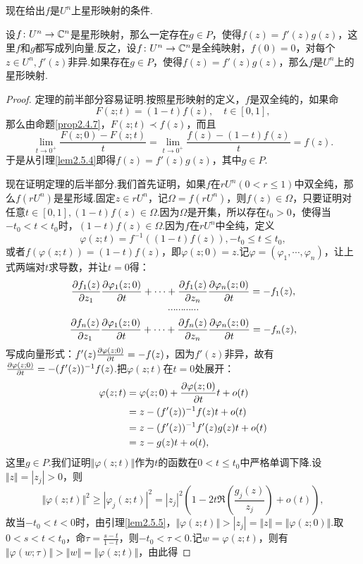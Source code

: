 现在给出$f$是$U^n$上星形映射的条件.
\begin{theorem}\label{thm2.5.6}
	设$f\colon U^n\to\mathbb C^n$是星形映射，那么一定存在$g\in P$，使得$f(z)=f'(z)g(z)$，这里$f$和$g$都写成列向量.反之，设$f\colon U^n\to\mathbb C^n$是全纯映射，$f(0)=0$，对每个$z\in U^n,f'(z)$非异.如果存在$g\in P$，使得$f(z)=f'(z)g(z)$，那么$f$是$U^n$上的星形映射.
\end{theorem}
\begin{proof}
	定理的前半部分容易证明.按照星形映射的定义，$f$是双全纯的，如果命
	\[F(z;t)=(1-t)f(z),\quad t\in[0,1],\]
	那么由命题\ref{prop2.4.7}，$F(z;t)\prec f(z)$，而且
	\[
	\lim_{t\to 0^+}\frac{F(z;0)-F(z;t)}{t}
	=\lim_{t\to 0^+}\frac{f(z)-(1-t)f(z)}{t}
	=f(z).
	\]
	于是从引理\ref{lem2.5.4}即得$f(z)=f'(z)g(z)$，其中$g\in P$.
	
	现在证明定理的后半部分.我们首先证明，如果$f$在$rU^n(0<r\le1)$中双全纯，那么$f(rU^n)$是星形域.固定$z\in rU^n$，记$\Omega=f(rU^n)$，则$f(z)\in\Omega$，只要证明对任意$t\in[0,1],(1-t)f(z)\in\Omega$.因为$\Omega$是开集，所以存在$t_0>0$，使得当$-t_0<t<t_0$时，$(1-t)f(z)\in\Omega$.因为$f$在$rU^n$中全纯，定义
	\[\varphi(z;t)=f^{-1}((1-t)f(z)),-t_0\le t\le t_0,\]
	或者$f(\varphi(z;t))=(1-t)f(z)$，即$\varphi(z;0)=z$.记$\varphi=(\varphi_1,\cdots,\varphi_n)$，让上式两端对$t$求导数，并让$t=0$得：
	\[\frac{\partial f_1(z)}{\partial z_1}\frac{\partial \varphi_1(z;0)}{\partial t}+\cdots+\frac{\partial f_1(z)}{\partial z_n}\frac{\partial \varphi_n(z;0)}{\partial t}=-f_1(z),\]
	\[\cdots\cdots\cdots\cdots\]
	\[\frac{\partial f_n(z)}{\partial z_1}\frac{\partial \varphi_1(z;0)}{\partial t}+\cdots+\frac{\partial f_n(z)}{\partial z_n}\frac{\partial \varphi_n(z;0)}{\partial t}=-f_n(z),\]
	写成向量形式：$f'(z)\frac{\partial \varphi(z;0)}{\partial t}=-f(z)$，因为$f'(z)$非异，故有$\frac{\partial \varphi(z;0)}{\partial t}=-(f'(z))^{-1}f(z)$.把$\varphi(z;t)$在$t=0$处展开：
	\begin{align*}
		\varphi(z;t)
		&=\varphi(z;0)+\frac{\partial \varphi(z;0)}{\partial t}t+o(t)\\
		&=z-(f'(z))^{-1} f(z)t+o(t)\\
		&=z-(f'(z))^{-1} f'(z)g(z)t+o(t)\\
		&=z-g(z)t+o(t),
	\end{align*}
这里$g\in P$.我们证明$\Vert\varphi(z;t)\Vert$作为$t$的函数在$0<t\le t_0$中严格单调下降.设$\Vert z\Vert=|z_j|>0$，则
\begin{equation}\label{eq2.5.5}
	\Vert\varphi(z;t)\Vert^2\ge|\varphi_j(z;t)|^2
	=|z_j|^2\left(1-2t\Re\left(\frac{g_j(z)}{z_j}\right)+o(t)\right),
\end{equation}
故当$-t_0<t<0$时，由引理\ref{lem2.5.5}，$\Vert\varphi(z;t)\Vert>|z_j|=\Vert z\Vert=\Vert\varphi(z;0)\Vert$.取$0<s<t<t_0$，命$\tau=\frac{s-t}{1-t}$，则$-t_0<\tau<0$.记$w=\varphi(z;t)$，则有$\Vert\varphi(w;\tau)\Vert>\Vert w\Vert=\Vert\varphi(z;t)\Vert$，由此得

\end{proof}
